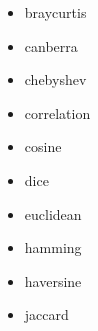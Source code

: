 \begin{minipage}[!h]{0.45\textwidth}
    \begin{itemize}
      \item braycurtis
      \item canberra
      \item chebyshev
      \item correlation
      \item cosine
      \item dice
      \item euclidean
      \item hamming
      \item haversine
      \item jaccard
    \end{itemize}
\end{minipage} %

